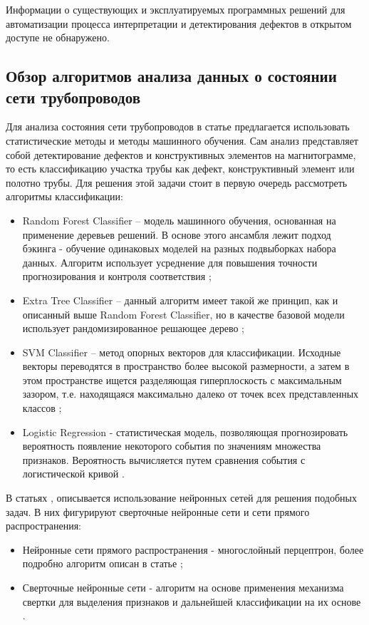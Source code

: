\documentclass[a4paper,article,14pt]{extarticle}
\begin{document}
Информации о существующих и эксплуатируемых программных решений для автоматизации процесса интерпретации и детектирования дефектов в открытом доступе не обнаружено.

\subsection{Обзор алгоритмов анализа данных о состоянии сети трубопроводов}

Для анализа состояния сети трубопроводов в статье \cite{a2} предлагается использовать 
статистические методы и методы машинного обучения. Сам анализ представляет собой детектирование дефектов и 
конструктивных элементов на магнитограмме, то есть классификацию участка трубы как дефект, конструктивный 
элемент или полотно трубы. Для решения этой задачи стоит в первую очередь рассмотреть алгоритмы классификации:

\begin{itemize}
    \item Random Forest Classifier – модель машинного обучения, основанная на применение деревьев решений. В основе этого ансамбля лежит подход бэкинга - обучение одинаковых моделей на разных подвыборках набора данных. Алгоритм использует усреднение для повышения точности прогнозирования и контроля соответствия \cite{a3};
    \item Extra Tree Classifier – данный алгоритм имеет такой же принцип, как и описанный выше Random Forest Classifier, но в качестве базовой модели использует рандомизированное решающее дерево \cite{a4};
    \item SVM Classifier – метод опорных векторов для классификации. Исходные векторы переводятся в пространство более высокой размерности, а затем в этом пространстве ищется разделяющая гиперплоскость с максимальным зазором, т.е. находящаяся максимально далеко от точек всех представленных классов \cite{a5};
    \item Logistic Regression - статистическая модель, позволяющая прогнозировать вероятность появление некоторого события по значениям множества признаков. Вероятность вычисляется путем сравнения события с логистической кривой \cite{a6}.
\end{itemize}

В статьях  \cite{a7}, \cite{a8} описывается использование нейронных сетей для решения подобных задач. В них фигурируют сверточные нейронные сети и сети прямого распространения:

\begin{itemize}
    \item Нейронные сети прямого распространения - многослойный перцептрон, более подробно алгоритм описан в статье \cite{a9};
    \item Сверточные нейронные сети - алгоритм на основе применения механизма свертки для выделения
    признаков и дальнейшей классификации на их основе \cite{a10}.
\end{itemize}
\end{document}
